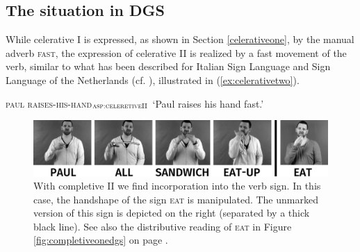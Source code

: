 \noindent 






\subsection{The situation in DGS}

While celerative I is expressed, as shown in Section \ref{celerativeone}, by the manual adverb \textsc{fast}, the expression of celerative II is realized by a fast movement of the verb, similar to what has been described for Italian Sign Language and Sign Language of the Netherlands (cf. \citealt{brunelli2011antisymmetry}), illustrated in (\ref{ex:celerativetwo}).

\begin{exe}
\ex\label{ex:celerativetwo}

{\textsc{paul raises-his-hand}$_{\textsc{asp:celeretiveII}}$}     
\glt `Paul raises his hand fast.'
\end{exe}


\begin{figure}[bt]
\centering
	\includegraphics[width=\textwidth]{aufessensw.jpg}
	\caption{With completive II we find incorporation into the verb sign. In this case, the handshape of the sign \textsc{eat} is manipulated. The unmarked version of this sign is depicted on the right (separated by a thick black line). See also the distributive reading of \textsc{eat} in Figure \ref{fig:completiveonedgs} on page \pageref{fig:completiveonedgs}.}
	\label{labelfigure}
\end{figure}

